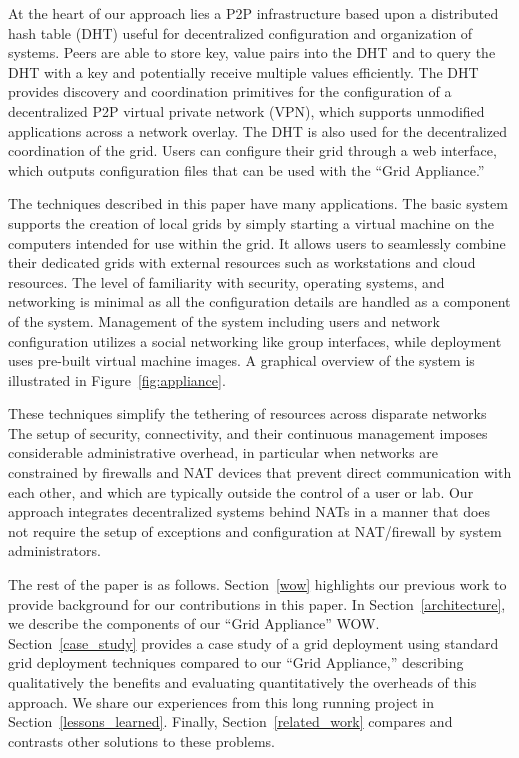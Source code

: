 \documentclass[conference]{IEEEtran}
\begin{document}
At the heart of our approach lies a P2P infrastructure based upon a distributed
hash table (DHT) useful for decentralized configuration and organization of
systems.  Peers are able to store key, value pairs into the DHT and to query
the DHT with a key and potentially receive multiple values efficiently.  The
DHT provides discovery and coordination primitives for the configuration of a
decentralized P2P virtual private network (VPN), which supports unmodified
applications across a network overlay.  The DHT is also used for the
decentralized coordination of the grid.  Users can configure their grid through
a web interface, which outputs configuration files that can be used with the
``Grid Appliance.''

The techniques described in this paper have many applications.  The basic
system supports the creation of local grids by simply starting a virtual
machine on the computers intended for use within the grid.  It allows users to
seamlessly combine their dedicated grids with external resources such as
workstations and cloud resources.  The level of familiarity with security,
operating systems, and networking is minimal as all the configuration details
are handled as a component of the system.  Management of the system including
users and network configuration utilizes a social networking like group
interfaces, while deployment uses pre-built virtual machine images.  A
graphical overview of the system is illustrated in Figure~\ref{fig:appliance}.

These techniques simplify the tethering of resources across disparate networks
The setup of security, connectivity, and their continuous management imposes
considerable administrative overhead, in particular when networks are
constrained by firewalls and NAT devices that prevent direct communication with
each other, and which are typically outside the control of a user or lab.  Our
approach integrates decentralized systems behind NATs in a manner that does not
require the setup of exceptions and configuration at NAT/firewall by system
administrators.

The rest of the paper is as follows.  Section~\ref{wow} highlights our previous
work to provide background for our contributions in this paper.  In
Section~\ref{architecture}, we describe the components of our ``Grid
Appliance'' WOW.  Section~\ref{case_study} provides a case study of a grid
deployment using standard grid deployment techniques compared to our ``Grid
Appliance,'' describing qualitatively the benefits and evaluating
quantitatively the overheads of this approach.  We share our experiences from
this long running project in Section~\ref{lessons_learned}.  Finally,
Section~\ref{related_work} compares and contrasts other solutions to these
problems.
\end{document}
